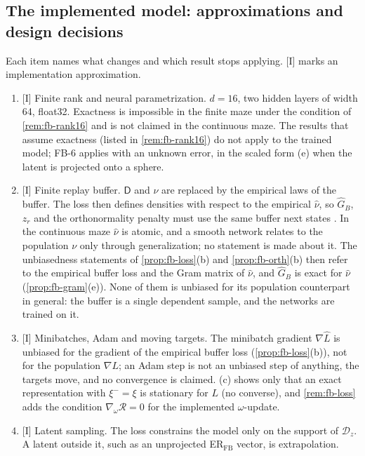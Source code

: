 \subsection{The implemented model: approximations and design decisions}\label{sec:fb-impl}

\begin{remark}\label{rem:fb-approx}
Each item names what changes and which result stops applying. \textsf{[I]} marks an implementation approximation.
\begin{enumerate}[nosep,label=(\arabic*)]
\item \textsf{[I] Finite rank and neural parametrization.} $d=16$, two hidden layers of width 64, float32. Exactness is impossible in the finite maze under the condition of \cref{rem:fb-rank16} and is not claimed in the continuous maze.
  The results that assume exactness (listed in \cref{rem:fb-rank16}) do not apply to the trained model; FB-6 applies with an unknown error, in the scaled form (e) when the latent is projected onto a sphere.
\item \textsf{[I] Finite replay buffer.} $\mathsf D$ and $\nu$ are replaced by the empirical laws of the buffer. The loss then defines densities with respect to the empirical $\hat\nu$, so $\hat G_B$, $z_r$ and the orthonormality penalty must use the same buffer next states . In the continuous maze $\hat\nu$ is atomic, and a smooth network relates to the population $\nu$ only through generalization; no statement is made about it.
  The unbiasedness statements of \cref{prop:fb-loss}(b) and \cref{prop:fb-orth}(b) then refer to the empirical buffer loss and the Gram matrix of $\hat\nu$, and $\hat G_B$ is exact for $\hat\nu$ (\cref{prop:fb-gram}(e)). None of them is unbiased for its population counterpart in general: the buffer is a single dependent sample, and the networks are trained on it.
\item \textsf{[I] Minibatches, Adam and moving targets.} The minibatch gradient $\nabla\hat L$ is unbiased for the gradient of the empirical buffer loss (\cref{prop:fb-loss}(b)), not for the population $\nabla L$; an Adam step is not an unbiased step of anything, the targets move, and no convergence is claimed.
  (c) shows only that an exact representation with $\xi^-=\xi$ is stationary for $L$ (no converse), and \cref{rem:fb-loss} adds the condition $\nabla_\omega\mathcal R=0$ for the implemented $\omega$-update.
\item \textsf{[I] Latent sampling.} The loss constrains the model only on the support of $\mathcal D_z$. A latent outside it, such as an unprojected ER$_{\mathrm{FB}}$ vector, is extrapolation.

\end{enumerate}
\end{remark}
